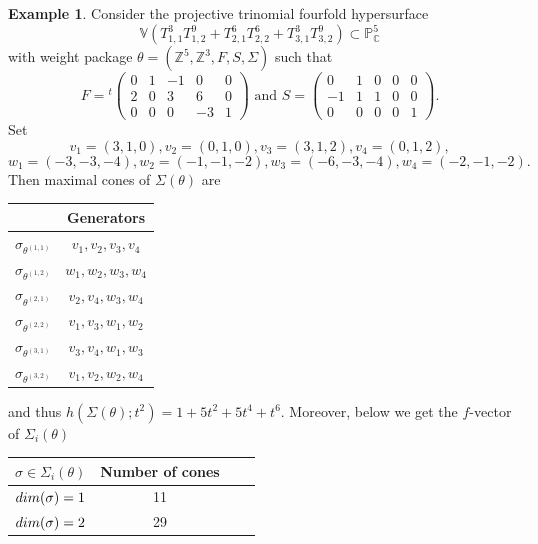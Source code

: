 \documentclass[11pt, reqno]{amsart}
\theoremstyle{plain}
\theoremstyle{definition}
\newtheorem{example}[theorem]{Example}
\theoremstyle{remark}
\begin{document}
\begin{example}
Consider the projective trinomial fourfold hypersurface
$$\mathbb{V}(T_{1,1}^{3} T_{1,2}^{9} + T_{2,1}^{6} T_{2,2}^{6} + T_{3,1}^{3} T_{3,2}^{9})\subset \mathbb{P}_{\mathbb{C}}^{5}$$
with weight package $\theta =  (\mathbb{Z}^{5}, \mathbb{Z}^{3}, F, S, \Sigma)$ such that
$$ F  = {}^{t} \begin{pmatrix}
 0 &   1 & -1 & 0& 0  \\
 2 &  0 &  3& 6& 0  \\
 0  &  0 &  0 & -3& 1
\end{pmatrix} \text{ and } S  = \begin{pmatrix}
 0 &   1 & 0 & 0& 0  \\
 -1 &  1 &  1& 0& 0  \\
 0  &  0 &  0 & 0& 1
\end{pmatrix}.$$
Set
$$v_{1} =  (3,1, 0), v_{2} =  (0,1,0), v_{3} =  (3,1,2), v_{4} =  (0,1,2),$$
$$w_{1} =  (-3,-3,-4), w_{2} =  (-1,-1, -2), w_{3} =  (-6, -3, -4), w_{4} =  (-2,-1, -2).$$
Then maximal cones of $\Sigma(\theta)$ are
\begin{center}
 \begin{tabular}{ |c|c|}
 \hline 
  &  Generators \\ 
 \hline\hline
 $\sigma_{\theta^{(1,1)}}$ & $v_{1}, v_{2}, v_{3}, v_{4}$ \\ 
 \hline
  $\sigma_{\theta^{(1,2)}} $ & $w_{1}, w_{2}, w_{3}, w_{4}$  \\   
 \hline
  $\sigma_{\theta^{(2,1)}}$ & $ v_{2}, v_{4},  w_{3},  w_{4}$  \\ 
 \hline
  $\sigma_{\theta^{(2,2)}}$ & $ v_{1}, v_{3}, w_{1} , w_{2}$  \\
 \hline
  $\sigma_{\theta^{(3,1)}} $ & $ v_{3}, v_{4}, w_{1} , w_{3}$  \\
 \hline
  $\sigma_{\theta^{(3,2)}}$ & $v_{1},  v_{2}, w_{2}, w_{4}$  \\
 \hline
\end{tabular}
\end{center}
and thus $h(\Sigma(\theta);t^{2})  =   1 + 5t^{2} + 5t^{4} + t^{6}$.
Moreover, below  we get the $f$-vector of $\Sigma_{i}(\theta)$
\begin{center}
\begin{tabular}{|c|c|l|r|} 
\hline  
$\sigma\in \Sigma_{i}(\theta)$ & Number of cones\\  
 \hline\hline
${\rm dim}(\sigma) = 1$ & 11  \\  
\hline
${\rm dim}(\sigma) =2$ & 29 \\ 

\end{tabular}
\end{center}
\end{example}
\end{document}
